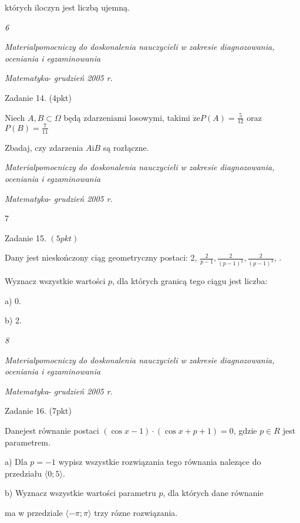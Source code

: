 \documentclass[a4paper,12pt]{article}
\begin{document}
których iloczyn jest liczbą ujemną.





{\it 6}

{\it Materialpomocniczy do doskonalenia nauczycieli w zakresie diagnozowania, oceniania i egzaminowania}

{\it Matematyka}- {\it grudzień 2005 r}.

Zadanie 14. (4pkt)

Niech $A, B \subset \Omega$ będą zdarzeniami losowymi, takimi $\displaystyle \dot{\mathrm{z}}\mathrm{e}P(A)=\frac{5}{12}$ oraz $P(B)=\displaystyle \frac{7}{11}$

Zbadaj, czy zdarzenia $A\mathrm{i}B$ są rozłączne.





{\it Materialpomocniczy do doskonalenia nauczycieli w zakresie diagnozowania, oceniania i egzaminowania}

{\it Matematyka}- {\it grudzień 2005 r}.

7

Zadanie 15. $(5pkt)$

Dany jest nieskończony ciąg geometryczny postaci: 2, $\displaystyle \frac{2}{p-1}, \displaystyle \frac{2}{(p-1)^{2}}, \displaystyle \frac{2}{(p-1)^{3}}$, .

Wyznacz wszystkie wartości $p$, dla których granicą tego ciągu jest liczba:

a) 0.

b) 2.





{\it 8}

{\it Materialpomocniczy do doskonalenia nauczycieli w zakresie diagnozowania, oceniania i egzaminowania}

{\it Matematyka}- {\it grudzień 2005 r}.

Zadanie 16. (7pkt)

Danejest równanie postaci $(\cos x-1)\cdot(\cos x+p+1)=0$, gdzie $p\in R$ jest parametrem.

a) Dla $p=-1$ wypisz wszystkie rozwiązania tego równania nalezące do przedziału $\langle 0;5\rangle.$

b) Wyznacz wszystkie wartości parametru $p$, dla których dane równanie

ma w przedziale $\langle-\pi;\pi\rangle$ trzy rózne rozwiązania.
\end{document}
